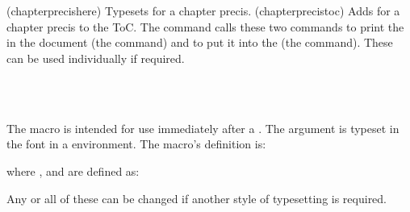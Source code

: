 \begin{syntax}
\cmd{\chapterprecishere} \\
\cmd{\chapterprecistoc} \\
\end{syntax}
\glossary(chapterprecishere)%
  {}%
  {Typesets  for a chapter precis.}
\glossary(chapterprecistoc)%
  {}%
  {Adds  for a chapter precis to the ToC.}
 The \cmd{\chapterprecis} command calls these two commands to print the
  in the document (the \cmd{\chapterprecishere} command) 
 and to put it into the \toc{} (the \cmd{\chapterprecistoc} command). 
 These can be used individually if required.

\begin{syntax}
\cmd{\precisfont} \\
\cmd{\prechapterprecis} \cmd{\postchapterprecis} \\
\end{syntax}
The \cmd{\chapterprecishere} macro is intended for use immediately after 
a \cmd{\chapter}. The  argument is typeset in
the \cmd{\precisfont} font in a  environment. The macro's 
definition is:
\begin{lcode}
\newcommand{\chapterprecishere}[1]{%
  \prechapterprecis #1\postchapterprecis}
\end{lcode}
where \cmd{\prechapterprecis}, \cmd{\postchapterprecis} and \cmd{\precisfont}
are defined as:
\begin{lcode}
\newcommand{\prechapterprecis}{%
  \vspace*{\prechapterprecisshift}%
  \begin{quote}\precisfont}
\newcommand{\postchapterprecis}{\end{quote}}
\newcommand*{\precisfont}{\normalfont\itshape}
\end{lcode}
Any or all of these can be changed if another style of typesetting is required.

